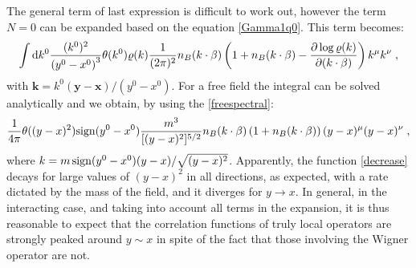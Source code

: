 \documentclass[prd,superscriptaddress,nofootinbib,notitlepage]{revtex4-1}
\newcommand{\di}{{\rm d}}
\newcommand{\kb}{{\mathbf{k}}}
\newcommand{\x}{{\mathbf{x}}}
\newcommand{\y}{{\mathbf{y}}}
\newcommand{\be}{\begin{equation}}
\newcommand{\ee}{\end{equation}}
\begin{document}
%
The general term of last expression is difficult to work out, however the term $N=0$ can be expanded based on the 
equation \eqref{Gamma1q0}. This term becomes:
%
\begin{align*}
   \int \di k^0 \frac{(k^0)^2}{\left(y^0-x^0\right)^3} \theta(k^0) \varrho(k) \frac{1}{(2\pi)^2} n_B(k\cdot\beta) 
   \left( 1 + n_B(k\cdot\beta) - \frac{\partial \log \varrho(k)} {\partial (k\cdot \beta)} \right) k^\mu k^\nu   \;,
\end{align*}
%
with $\kb = k^0(\y-\x)/(y^0-x^0)$. For a free field the integral can be solved analytically and we obtain,
by using the \eqref{freespectral}:
%
\be\label{decrease}
\frac{1}{4\pi} \theta((y-x)^2) {\rm sign}(y^0-x^0) \frac{m^3}{[(y-x)^2]^{5/2}} n_B( k \cdot \beta) 
\left(1+n_B(k \cdot \beta)\right) (y-x)^\mu (y-x)^\nu\;,
\ee
%
where $k = m \, {\rm sign}(y^0-x^0) (y-x)/\sqrt{(y-x)^2}$. Apparently, the function \eqref{decrease} decays for
large values of $(y-x)^2$ in all directions, as expected, with a rate dictated by the mass of the field, and it
diverges for $y \to x$. In general, in the interacting case, and taking into account all terms in the expansion,
it is thus reasonable to expect that the correlation functions of truly local operators are strongly peaked around 
$y \sim x$ in spite of the fact that those involving the Wigner operator are not. 
\end{document}
